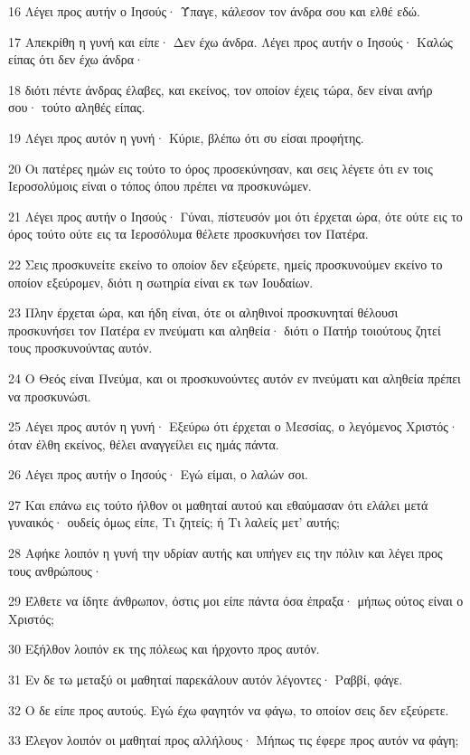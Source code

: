 \par 16 Λέγει προς αυτήν ο Ιησούς· Ύπαγε, κάλεσον τον άνδρα σου και ελθέ εδώ.
\par 17 Απεκρίθη η γυνή και είπε· Δεν έχω άνδρα. Λέγει προς αυτήν ο Ιησούς· Καλώς είπας ότι δεν έχω άνδρα·
\par 18 διότι πέντε άνδρας έλαβες, και εκείνος, τον οποίον έχεις τώρα, δεν είναι ανήρ σου· τούτο αληθές είπας.
\par 19 Λέγει προς αυτόν η γυνή· Κύριε, βλέπω ότι συ είσαι προφήτης.
\par 20 Οι πατέρες ημών εις τούτο το όρος προσεκύνησαν, και σεις λέγετε ότι εν τοις Ιεροσολύμοις είναι ο τόπος όπου πρέπει να προσκυνώμεν.
\par 21 Λέγει προς αυτήν ο Ιησούς· Γύναι, πίστευσόν μοι ότι έρχεται ώρα, ότε ούτε εις το όρος τούτο ούτε εις τα Ιεροσόλυμα θέλετε προσκυνήσει τον Πατέρα.
\par 22 Σεις προσκυνείτε εκείνο το οποίον δεν εξεύρετε, ημείς προσκυνούμεν εκείνο το οποίον εξεύρομεν, διότι η σωτηρία είναι εκ των Ιουδαίων.
\par 23 Πλην έρχεται ώρα, και ήδη είναι, ότε οι αληθινοί προσκυνηταί θέλουσι προσκυνήσει τον Πατέρα εν πνεύματι και αληθεία· διότι ο Πατήρ τοιούτους ζητεί τους προσκυνούντας αυτόν.
\par 24 Ο Θεός είναι Πνεύμα, και οι προσκυνούντες αυτόν εν πνεύματι και αληθεία πρέπει να προσκυνώσι.
\par 25 Λέγει προς αυτόν η γυνή· Εξεύρω ότι έρχεται ο Μεσσίας, ο λεγόμενος Χριστός· όταν έλθη εκείνος, θέλει αναγγείλει εις ημάς πάντα.
\par 26 Λέγει προς αυτήν ο Ιησούς· Εγώ είμαι, ο λαλών σοι.
\par 27 Και επάνω εις τούτο ήλθον οι μαθηταί αυτού και εθαύμασαν ότι ελάλει μετά γυναικός· ουδείς όμως είπε, Τι ζητείς; ή Τι λαλείς μετ' αυτής;
\par 28 Αφήκε λοιπόν η γυνή την υδρίαν αυτής και υπήγεν εις την πόλιν και λέγει προς τους ανθρώπους·
\par 29 Έλθετε να ίδητε άνθρωπον, όστις μοι είπε πάντα όσα έπραξα· μήπως ούτος είναι ο Χριστός;
\par 30 Εξήλθον λοιπόν εκ της πόλεως και ήρχοντο προς αυτόν.
\par 31 Εν δε τω μεταξύ οι μαθηταί παρεκάλουν αυτόν λέγοντες· Ραββί, φάγε.
\par 32 Ο δε είπε προς αυτούς. Εγώ έχω φαγητόν να φάγω, το οποίον σεις δεν εξεύρετε.
\par 33 Έλεγον λοιπόν οι μαθηταί προς αλλήλους· Μήπως τις έφερε προς αυτόν να φάγη;
